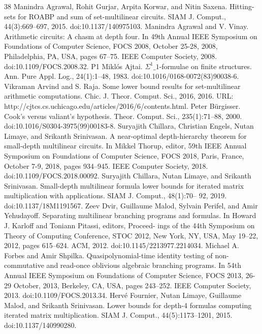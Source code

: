 \documentclass[10pt,a4paper]{article}
\begin{document}
\begin{thebibliography}{38}
 Manindra Agrawal, Rohit Gurjar, Arpita Korwar, and Nitin Saxena. Hitting-sets for ROABP and sum of set-multilinear circuits. SIAM J. Comput., 44(3):669–697, 2015. doi:10.1137/140975103.
 Manindra Agrawal and V. Vinay. Arithmetic circuits: A chasm at depth four. In 49th Annual IEEE Symposium on Foundations of Computer Science, FOCS 2008, October 25-28, 2008, Philadelphia, PA, USA, pages 67–75. IEEE Computer Society, 2008. doi:10.1109/FOCS.2008.32. P1
 Miklós Ajtai. $\Sigma^1\_1$-formulae on finite structures. Ann. Pure Appl. Log., 24(1):1–48, 1983. doi:10.1016/0168-0072(83)90038-6.
 Vikraman Arvind and S. Raja. Some lower bound results for set-multilinear arithmetic computations. Chic. J. Theor. Comput. Sci., 2016, 2016. URL: http://cjtcs.cs.uchicago.edu/articles/2016/6/contents.html.
 Peter Bürgisser. Cook’s versus valiant’s hypothesis. Theor. Comput. Sci., 235(1):71–88, 2000. doi:10.1016/S0304-3975(99)00183-8.
 Suryajith Chillara, Christian Engels, Nutan Limaye, and Srikanth Srinivasan. A near-optimal depth-hierarchy theorem for small-depth multilinear circuits. In Mikkel Thorup, editor, 59th IEEE Annual Symposium on Foundations of Computer Science, FOCS 2018, Paris, France, October 7-9, 2018, pages 934–945. IEEE Computer Society, 2018. doi:10.1109/FOCS.2018.00092.
 Suryajith Chillara, Nutan Limaye, and Srikanth Srinivasan. Small-depth multilinear formula lower bounds for iterated matrix multiplication with applications. SIAM J. Comput., 48(1):70– 92, 2019. doi:10.1137/18M1191567.
 Zeev Dvir, Guillaume Malod, Sylvain Perifel, and Amir Yehudayoff. Separating multilinear branching programs and formulas. In Howard J. Karloff and Toniann Pitassi, editors, Proceed- ings of the 44th Symposium on Theory of Computing Conference, STOC 2012, New York, NY, USA, May 19–22, 2012, pages 615–624. ACM, 2012. doi:10.1145/2213977.2214034.
 Michael A. Forbes and Amir Shpilka. Quasipolynomial-time identity testing of non- commutative and read-once oblivious algebraic branching programs. In 54th Annual IEEE Symposium on Foundations of Computer Science, FOCS 2013, 26-29 October, 2013, Berkeley, CA, USA, pages 243–252. IEEE Computer Society, 2013. doi:10.1109/FOCS.2013.34.
 Hervé Fournier, Nutan Limaye, Guillaume Malod, and Srikanth Srinivasan. Lower bounds for depth-4 formulas computing iterated matrix multiplication. SIAM J. Comput., 44(5):1173–1201, 2015. doi:10.1137/140990280.

\end{thebibliography}
\end{document}
